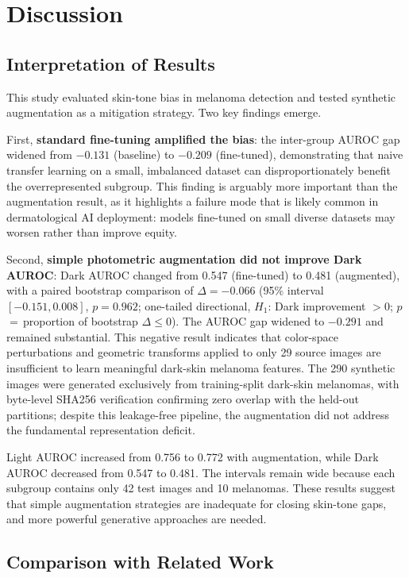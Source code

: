 \section{Discussion}

\subsection{Interpretation of Results}

This study evaluated skin-tone bias in melanoma detection and tested synthetic augmentation as a mitigation strategy. Two key findings emerge.

First, \textbf{standard fine-tuning amplified the bias}: the inter-group AUROC gap widened from $-0.131$ (baseline) to $-0.209$ (fine-tuned), demonstrating that naive transfer learning on a small, imbalanced dataset can disproportionately benefit the overrepresented subgroup. This finding is arguably more important than the augmentation result, as it highlights a failure mode that is likely common in dermatological AI deployment: models fine-tuned on small diverse datasets may worsen rather than improve equity.

Second, \textbf{simple photometric augmentation did not improve Dark AUROC}: Dark AUROC changed from 0.547 (fine-tuned) to 0.481 (augmented), with a paired bootstrap comparison of $\Delta=-0.066$ (95\% interval $[-0.151,0.008]$, $p=0.962$; one-tailed directional, $H_1$: Dark improvement $>0$; $p$\,$=$\,proportion of bootstrap $\Delta \leq 0$). The AUROC gap widened to $-0.291$ and remained substantial. This negative result indicates that color-space perturbations and geometric transforms applied to only 29 source images are insufficient to learn meaningful dark-skin melanoma features. The 290 synthetic images were generated exclusively from training-split dark-skin melanomas, with byte-level SHA256 verification confirming zero overlap with the held-out partitions; despite this leakage-free pipeline, the augmentation did not address the fundamental representation deficit.

Light AUROC increased from 0.756 to 0.772 with augmentation, while Dark AUROC decreased from 0.547 to 0.481. The intervals remain wide because each subgroup contains only 42 test images and 10 melanomas. These results suggest that simple augmentation strategies are inadequate for closing skin-tone gaps, and more powerful generative approaches are needed.

\subsection{Comparison with Related Work}

